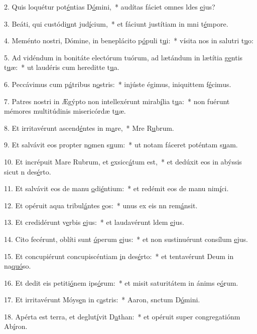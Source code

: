 2. Quis loquétur pot\uline{é}ntias D\uline{ó}mini,~* audítas fáciet omnes ldes \uline{e}jus?\par 
3. Beáti, qui custódi\uline{u}nt jud\uline{í}cium,~* et fáciunt justítiam in mni t\uline{é}mpore.\par 
4. Meménto nostri, Dómine, in beneplácito p\uline{ó}puli t\uline{u}i:~* vísita nos in salutri t\uline{u}o:\par 
5. Ad vidéndum in bonitáte electórum tuórum, ad lætándum in lætítia g\uline{e}ntis t\uline{u}æ:~* ut laudéris cum hereditte t\uline{u}a.\par 
6. Peccávimus cum p\uline{á}tribus n\uline{o}stris:~* injúste égimus, iniquittem f\uline{é}cimus.\par 
7. Patres nostri in Ægýpto non intellexérunt mirab\uline{í}lia t\uline{u}a:~* non fuérunt mémores multitúdinis misericórdæ t\uline{u}æ.\par 
8. Et irritavérunt ascend\uline{é}ntes in m\uline{a}re,~* Mre R\uline{u}brum.\par 
9. Et salvávit eos propter n\uline{o}men s\uline{u}um:~* ut notam fáceret poténtam s\uline{u}am.\par 
10. Et incrépuit Mare Rubrum, et \uline{e}xsicc\uline{á}tum est,~* et dedúxit eos in abýssis sicut n des\uline{é}rto.\par 
11. Et salvávit eos de manu \uline{o}di\uline{é}ntium:~* et redémit eos de manu nim\uline{í}ci.\par 
12. Et opéruit aqua tribul\uline{á}ntes \uline{e}os:~* unus ex eis nn rem\uline{á}nsit.\par 
13. Et credidérunt v\uline{e}rbis \uline{e}jus:~* et laudavérunt ldem \uline{e}jus.\par 
14. Cito fecérunt, oblíti sunt \uline{ó}perum \uline{e}jus:~* et non sustinuérunt consílum \uline{e}jus.\par 
15. Et concupiérunt concupiscéntiam \uline{i}n des\uline{é}rto:~* et tentavérunt Deum in na\uline{quó}so.\par 
16. Et dedit eis petiti\uline{ó}nem ips\uline{ó}rum:~* et misit saturitátem in ánims e\uline{ó}rum.\par 
17. Et irritavérunt Móys\uline{e}n in c\uline{a}stris:~* Aaron, snctum D\uline{ó}mini.\par 
18. Apérta est terra, et deglut\uline{í}vit D\uline{a}than:~* et opéruit super congregatiónm Ab\uline{í}ron.\par 
